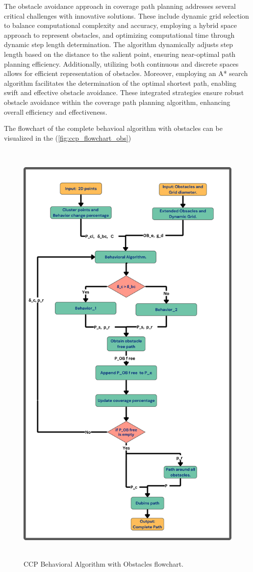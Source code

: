 The obstacle avoidance approach in coverage path planning addresses several critical challenges with innovative solutions. These include dynamic grid selection to balance computational complexity and accuracy, employing a hybrid space approach to represent obstacles, and optimizing computational time through dynamic step length determination. The algorithm dynamically adjusts step length based on the distance to the salient point, ensuring near-optimal path planning efficiency. Additionally, utilizing both continuous and discrete spaces allows for efficient representation of obstacles. Moreover, employing an A* search algorithm facilitates the determination of the optimal shortest path, enabling swift and effective obstacle avoidance. These integrated strategies ensure robust obstacle avoidance within the coverage path planning algorithm, enhancing overall efficiency and effectiveness.


\vspace{3mm}   


The flowchart of the complete behavioal algorithm with obstacles can be visualized in the (\autoref{fig:ccp_flowchart_obs})


\begin{figure}[H]
    \centering
    \includegraphics[height=22cm, width=\textwidth]{Images/flowchart/obs_flowchart.pdf}
    \caption{CCP Behavioral Algorithm with Obstacles flowchart.}
    \label{fig:ccp_flowchart_obs} 
\end{figure} 